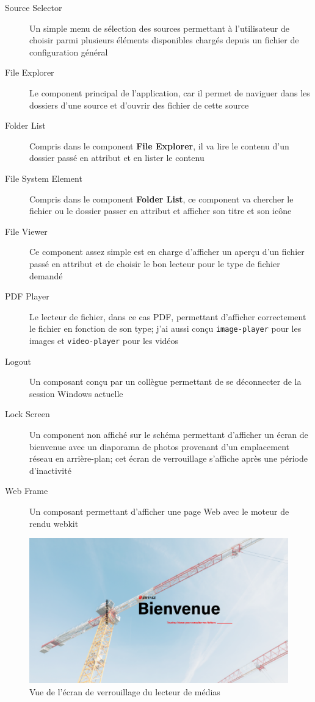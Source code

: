 \begin{description}
    \item[Source Selector] Un simple menu de sélection des sources permettant à l'utilisateur de choisir parmi plusieurs éléments disponibles chargés depuis un fichier de configuration général
    \item[File Explorer] Le component principal de l'application, car il permet de naviguer dans les dossiers d'une source et d'ouvrir des fichier  de cette source
    \item[Folder List] Compris dans le component \textbf{File Explorer}, il va lire le contenu d'un dossier passé en attribut et en lister le contenu
    \item[File System Element] Compris dans le component \textbf{Folder List}, ce component va chercher le fichier ou le dossier passer en attribut et afficher son titre et son icône
    \item[File Viewer] Ce component assez simple est en charge d'afficher un aperçu d'un fichier passé en attribut et de choisir le bon lecteur pour le type de fichier demandé
    \item[PDF Player] Le lecteur de fichier, dans ce cas PDF, permettant d'afficher correctement le fichier en fonction de son type; j’ai aussi conçu \texttt{image-player} pour les images et \texttt{video-player} pour les vidéos
    \item[Logout] Un composant conçu par un collègue permettant de se déconnecter de la session Windows actuelle
    \item[Lock Screen] Un component non affiché sur le schéma permettant d'afficher un écran de bienvenue avec un diaporama de photos provenant d'un emplacement réseau en arrière-plan; cet écran de verrouillage s'affiche après une période d'inactivité
    \item[Web Frame] Un composant permettant d'afficher une page Web avec le moteur de rendu webkit
\end{description}

\begin{figure}[h]
    \centering
    \includegraphics[scale=0.5]{img/media-reader-lock.png}
    \caption{Vue de l'écran de verrouillage du lecteur de médias}
\end{figure}

